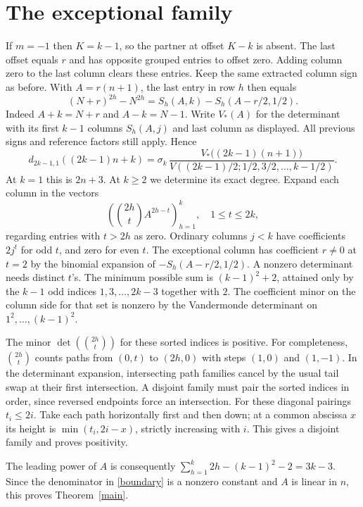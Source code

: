 \documentclass[11pt]{article}
\begin{document}
\section{The exceptional family}
If $m=-1$ then $K=k-1$, so the partner at offset $K-k$ is absent. The last offset equals $r$ and has opposite grouped entries to offset zero. Adding column zero to the last column clears these entries. Keep the same extracted column sign as before. With $A=r(n+1)$, the last entry in row $h$ then equals
\[
 (N+r)^{2h}-N^{2h}
   =S_h(A,k)-S_h(A-r/2,1/2).
\]
Indeed $A+k=N+r$ and $A-k=N-1$. Write $V_*(A)$ for the determinant with its first $k-1$ columns $S_h(A,j)$ and last column as displayed. All previous signs and reference factors still apply. Hence
\begin{equation}\label{boundary}
 d_{2k-1,1}((2k-1)n+k)=
 \sigma_k\,\frac{V_*\big((2k-1)(n+1)\big)}
 {V((2k-1)/2;1/2,3/2,\ldots,k-1/2)} .
\end{equation}
At $k=1$ this is $2n+3$. At $k\ge2$ we determine its exact degree. Expand each column in the vectors
\[
 \left(\binom{2h}{t}A^{2h-t}\right)_{h=1}^k,\quad 1\le t\le2k,
\]
regarding entries with $t>2h$ as zero. Ordinary columns $j<k$ have coefficients $2j^t$ for odd $t$, and zero for even $t$. The exceptional column has coefficient $r\ne0$ at $t=2$ by the binomial expansion of $-S_h(A-r/2,1/2)$. A nonzero determinant needs distinct $t$'s. The minimum possible sum is $(k-1)^2+2$, attained only by the $k-1$ odd indices $1,3,\ldots,2k-3$ together with $2$. The coefficient minor on the column side for that set is nonzero by the Vandermonde determinant on $1^2,\ldots,(k-1)^2$.

The minor $\det(\binom{2h}{t})$ for these sorted indices is positive. For completeness, $\binom{2h}{t}$ counts paths from $(0,t)$ to $(2h,0)$ with steps $(1,0)$ and $(1,-1)$. In the determinant expansion, intersecting path families cancel by the usual tail swap at their first intersection. A disjoint family must pair the sorted indices in order, since reversed endpoints force an intersection. For these diagonal pairings $t_i\le 2i$. Take each path horizontally first and then down; at a common abscissa $x$ its height is $\min(t_i,2i-x)$, strictly increasing with $i$. This gives a disjoint family and proves positivity.

The leading power of $A$ is consequently $\sum_{h=1}^k2h-(k-1)^2-2=3k-3$. Since the denominator in \eqref{boundary} is a nonzero constant and $A$ is linear in $n$, this proves Theorem~\ref{main}.
\end{document}
